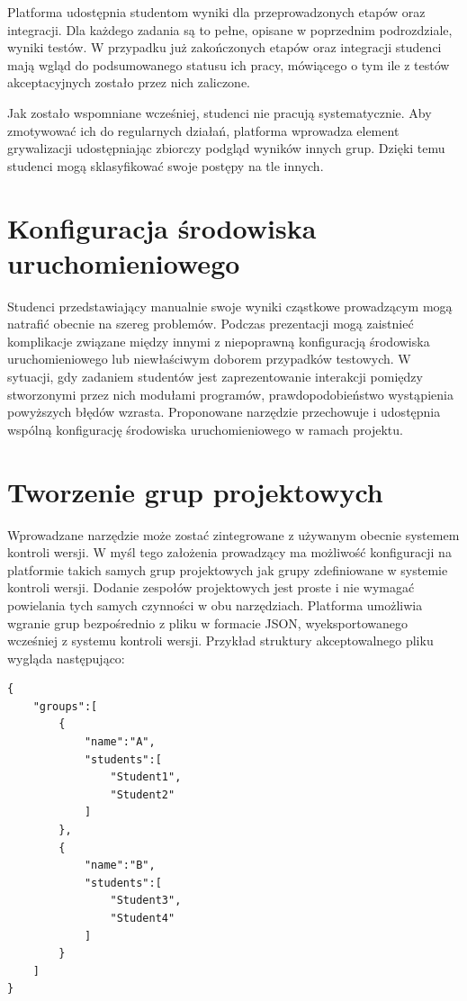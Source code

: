 Platforma udostępnia studentom wyniki dla przeprowadzonych etapów oraz integracji.
Dla każdego zadania są to pełne, opisane w poprzednim podrozdziale, wyniki testów.
W przypadku już zakończonych etapów oraz integracji studenci mają wgląd do podsumowanego statusu ich pracy, mówiącego o tym ile z testów akceptacyjnych zostało przez nich zaliczone.

Jak zostało wspomniane wcześniej, studenci nie pracują systematycznie.
Aby zmotywować ich do regularnych działań, platforma wprowadza element grywalizacji udostępniając zbiorczy podgląd wyników innych grup.
Dzięki temu studenci mogą sklasyfikować swoje postępy na tle innych.


\section{Konfiguracja środowiska uruchomieniowego}

Studenci przedstawiający manualnie swoje wyniki cząstkowe prowadzącym mogą natrafić obecnie na szereg problemów.
Podczas prezentacji mogą zaistnieć komplikacje związane między innymi z niepoprawną konfiguracją środowiska uruchomieniowego lub niewłaściwym doborem przypadków testowych.
W sytuacji, gdy zadaniem studentów jest zaprezentowanie interakcji pomiędzy stworzonymi przez nich modułami programów, prawdopodobieństwo wystąpienia powyższych błędów wzrasta.
Proponowane narzędzie przechowuje i udostępnia wspólną konfigurację środowiska uruchomieniowego w ramach projektu.


\section{Tworzenie grup projektowych}

Wprowadzane narzędzie może zostać zintegrowane z używanym obecnie systemem kontroli wersji.
W myśl tego założenia prowadzący ma możliwość konfiguracji na platformie takich samych grup projektowych jak grupy zdefiniowane w systemie kontroli wersji.
Dodanie zespołów projektowych jest proste i nie wymagać powielania tych samych czynności w obu narzędziach.
Platforma umożliwia wgranie grup bezpośrednio z pliku w formacie JSON, wyeksportowanego wcześniej z systemu kontroli wersji.
Przykład struktury akceptowalnego pliku wygląda następująco:

{\selectfont
\footnotesize
\begin{lstlisting}
{
    "groups":[
        {
            "name":"A",
            "students":[
                "Student1",
                "Student2"
            ]
        },
        {
            "name":"B",
            "students":[
                "Student3",
                "Student4"
            ]
        }
    ]
}
\end{lstlisting}
}


